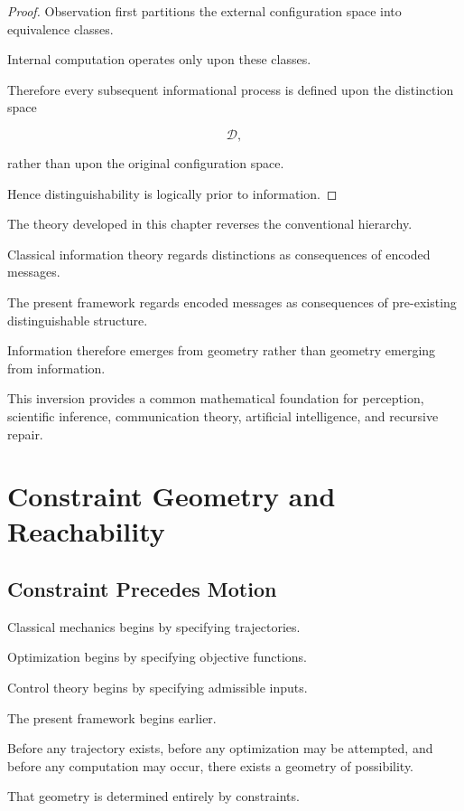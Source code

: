 \documentclass[11pt,oneside]{book}
\numberwithin{equation}{chapter}
\theoremstyle{definition}
\theoremstyle{plain}
\begin{document}
\begin{proof}

Observation first partitions the external configuration space into
equivalence classes.

Internal computation operates only upon these classes.

Therefore every subsequent informational process is defined upon the
distinction space

\[
\mathcal{D},
\]

rather than upon the original configuration space.

Hence distinguishability is logically prior to information.

\end{proof}

The theory developed in this chapter reverses the conventional hierarchy.

Classical information theory regards distinctions as consequences of encoded
messages.

The present framework regards encoded messages as consequences of
pre-existing distinguishable structure.

Information therefore emerges from geometry rather than geometry emerging from
information.

This inversion provides a common mathematical foundation for perception,
scientific inference, communication theory, artificial intelligence, and
recursive repair.

\chapter{Constraint Geometry and Reachability}

\section{Constraint Precedes Motion}

Classical mechanics begins by specifying trajectories.

Optimization begins by specifying objective functions.

Control theory begins by specifying admissible inputs.

The present framework begins earlier.

Before any trajectory exists, before any optimization may be attempted, and
before any computation may occur, there exists a geometry of possibility.

That geometry is determined entirely by constraints.
\end{document}
